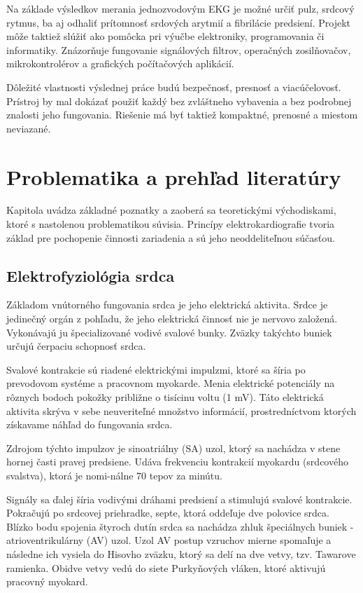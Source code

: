 \documentclass[titlepage,12pt]{article}
\begin{document}
Na základe výsledkov merania jednozvodovým EKG je možné určiť pulz, srdcový rytmus, ba aj odhaliť prítomnosť srdových arytmií a fibrilácie predsiení. Projekt môže taktiež slúžiť ako pomôcka pri výučbe elektroniky, programovania či informatiky. Znázorňuje fungovanie signálových filtrov, operačných zosilňovačov, mikrokontrolérov a grafických počítačových aplikácií.

Dôležité vlastnosti výslednej práce budú bezpečnosť, presnosť a viacúčelovosť. Prístroj by mal dokázať použiť každý bez zvláštneho vybavenia a bez podrobnej znalosti jeho fungovania. Riešenie má byť taktiež kompaktné, prenosné a miestom neviazané. 

\newpage
\section{Problematika a prehľad literatúry}
Kapitola uvádza základné poznatky a zaoberá sa teoretickými východiskami, ktoré s nastolenou problematikou súvisia. Princípy elektrokardiografie tvoria základ pre pochopenie činnosti zariadenia a sú jeho neoddeliteľnou súčasťou.


\subsection{Elektrofyziológia srdca}

Základom vnútorného fungovania srdca je jeho elektrická aktivita. Srdce je jedinečný orgán z pohľadu, že jeho elektrická činnosť nie je nervovo založená. Vykonávajú ju špecializované vodivé svalové bunky. Zväzky takýchto buniek určujú čerpaciu schopnosť srdca.

Svalové kontrakcie sú riadené elektrickými impulzmi, ktoré sa šíria po prevodovom systéme a pracovnom myokarde. Menia elektrické potenciály na rôznych bodoch pokožky približne \linebreak o tisícinu voltu (1 mV). Táto elektrická aktivita skrýva v sebe neuveriteľné množstvo informácií, prostredníctvom ktorých získavame náhľad do fungovania srdca.

Zdrojom týchto impulzov je sinoatriálny (SA) uzol, ktorý sa nachádza v stene hornej časti pravej predsiene. Udáva frekvenciu kontrakcií myokardu (srdcového svalstva), ktorá je nomi-nálne 70 tepov za minútu.

Signály sa ďalej šíria vodivými dráhami predsiení a stimulujú svalové kontrakcie. Pokračujú po srdcovej priehradke, septe, ktorá oddeľuje dve polovice srdca. Blízko bodu spojenia štyroch dutín srdca sa nachádza zhluk špeciálnych buniek - atrioventrikulárny (AV) uzol. Uzol AV postup vzruchov mierne spomaľuje a následne ich vysiela do Hisovho zväzku, ktorý sa delí na dve vetvy, tzv. Tawarove ramienka. Obidve vetvy vedú do siete Purkyňových vláken, ktoré aktivujú pracovný myokard.
\\
\\
\end{document}
